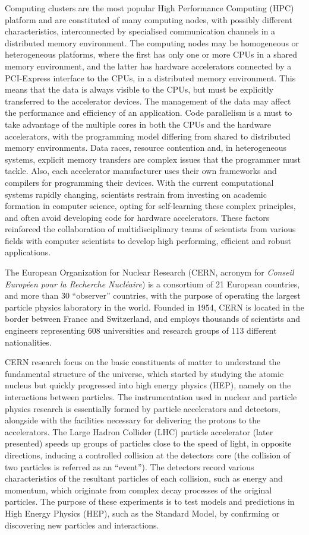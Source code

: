 Computing clusters are the most popular High Performance Computing (HPC) platform and are constituted of many computing nodes, with possibly different characteristics, interconnected by specialised communication channels in a distributed memory environment. The computing nodes may be homogeneous or heterogeneous platforms, where the first has only one or more CPUs in a shared memory environment, and the latter has hardware accelerators connected by a PCI-Express interface to the CPUs, in a distributed memory environment. This means that the data is always visible to the CPUs, but must be explicitly transferred to the accelerator devices. The management of the data may affect the performance and efficiency of an application. Code parallelism is a must to take advantage of the multiple cores in both the CPUs and the hardware accelerators, with the programming model differing from shared to distributed memory environments. Data races, resource contention and, in heterogeneous systems, explicit memory transfers are complex issues that the programmer must tackle. Also, each accelerator manufacturer uses their own frameworks and compilers for programming their devices. With the current computational systems rapidly changing, scientists restrain from investing on academic formation in computer science, opting for self-learning these complex principles, and often avoid developing code for hardware accelerators. These factors reinforced the collaboration of multidisciplinary teams of scientists from various fields with computer scientists to develop high performing, efficient and robust applications.

The European Organization for Nuclear Research \cite{CERN} (CERN, acronym for \textit{Conseil Européen pour la Recherche Nucléaire}) is a consortium of 21 European countries, and more than 30 ``observer'' countries, with the purpose of operating the largest particle physics laboratory in the world. Founded in 1954, CERN is located in the border between France and Switzerland, and employs thousands of scientists and engineers representing 608 universities and research groups of 113 different nationalities.

CERN research focus on the basic constituents of matter to understand the fundamental structure of the universe, which started by studying the atomic nucleus but quickly progressed into high energy physics (HEP), namely on the interactions between particles. The instrumentation used in nuclear and particle physics research is essentially formed by particle accelerators and detectors, alongside with the facilities necessary for delivering the protons to the accelerators. The Large Hadron Collider (LHC) particle accelerator (later presented) speeds up groups of particles close to the speed of light, in opposite directions, inducing a controlled collision at the detectors core (the collision of two particles is referred as an ``event''). The detectors record various characteristics of the resultant particles of each collision, such as energy and momentum, which originate from complex decay processes of the original particles. The purpose of these experiments is to test models and predictions in High Energy Physics (HEP), such as the Standard Model, by confirming or discovering new particles and interactions.

